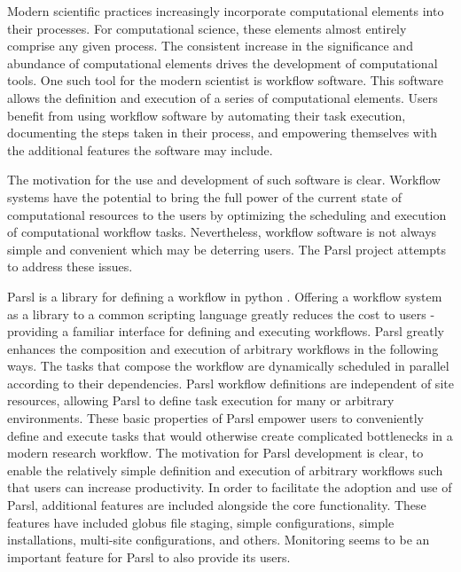 Modern scientific practices increasingly incorporate computational elements into their processes.
For computational science, these elements almost entirely comprise any given process.
The consistent increase in the significance and abundance of computational elements drives the development of computational tools.
One such tool for the modern scientist is workflow software.
This software allows the definition and execution of a series of computational elements.
Users benefit from using workflow software by automating their task execution, documenting the steps taken in their process, and empowering themselves with the additional features the software may include.

The motivation for the use and development of such software is clear.
Workflow systems have the potential to bring the full power of the current state of computational resources to the users by optimizing the scheduling and execution of computational workflow tasks.
Nevertheless, workflow software is not always simple and convenient which may be deterring users.
The Parsl project attempts to address these issues.

Parsl is a library for defining a workflow in python \cite{babuji_yadu_2017_853492}.
Offering a workflow system as a library to a common scripting language greatly reduces the cost to users - providing a familiar interface for defining and executing workflows.
Parsl greatly enhances the composition and execution of arbitrary workflows in the following ways.
The tasks that compose the workflow are dynamically scheduled in parallel according to their dependencies.
Parsl workflow definitions are independent of site resources, allowing Parsl to define task execution for many or arbitrary environments.
These basic properties of Parsl empower users to conveniently define and execute tasks that would otherwise create complicated bottlenecks in a modern research workflow.
The motivation for Parsl development is clear, to enable the relatively simple definition and execution of arbitrary workflows such that users can increase productivity.
In order to facilitate the adoption and use of Parsl, additional features are included alongside the core functionality.
These features have included globus file staging, simple configurations, simple installations, multi-site configurations, and others.
Monitoring seems to be an important feature for Parsl to also provide its users.

